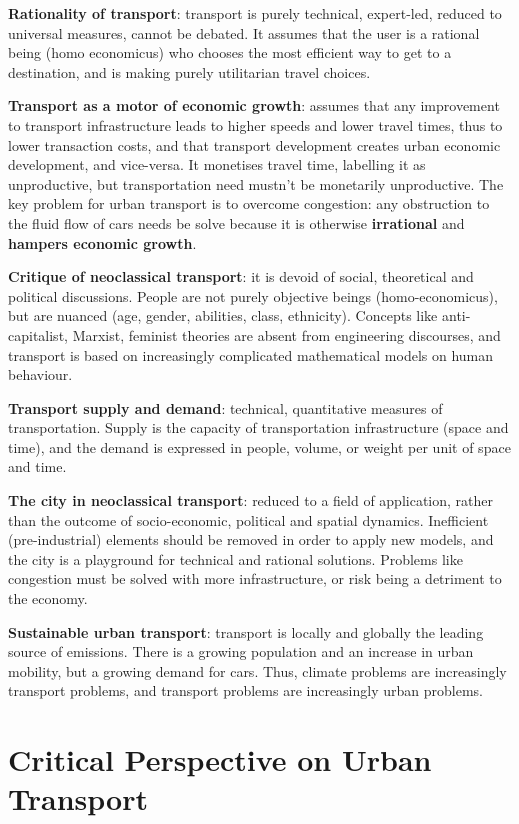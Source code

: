 \documentclass{article}
\newcommand{\alignedmarginpar}[1]{%
        \marginpar{\raggedright\small#1}}
\begin{document}
\textbf{Rationality of transport}: transport is purely technical, expert-led, reduced to universal measures, cannot be debated. It assumes that the user is a rational being (homo economicus) who chooses the most efficient way to get to a destination, and is making purely utilitarian travel choices.

\textbf{Transport as a motor of economic growth}: assumes that any improvement to transport infrastructure leads to higher speeds and lower travel times, thus to lower transaction costs, and that transport development creates urban economic development, and vice-versa. It monetises travel time, labelling it as unproductive, but transportation need mustn't be monetarily unproductive.\alignedmarginpar{Cycling for leisure}The key problem for urban transport is to overcome congestion: any obstruction to the fluid flow of cars needs be solve because it is otherwise \textbf{irrational} and \textbf{hampers economic growth}.

\textbf{Critique of neoclassical transport}: it is devoid of social, theoretical and political discussions. People are not purely objective beings (homo-economicus), but are nuanced (age, gender, abilities, class, ethnicity). Concepts like anti-capitalist, Marxist, feminist theories are absent from engineering discourses, and transport is based on increasingly complicated mathematical models on human behaviour.

\textbf{Transport supply and demand}: technical, quantitative measures of transportation. Supply is the capacity of transportation infrastructure (space and time), and the demand is expressed in people, volume, or weight per unit of space and time.

\textbf{The city in neoclassical transport}: reduced to a field of application, rather than the outcome of socio-economic, political and spatial dynamics. Inefficient (pre-industrial) elements should be removed in order to apply new models, and the city is a playground for technical and rational solutions. Problems like congestion must be solved with more infrastructure, or risk being a detriment to the economy.

\textbf{Sustainable urban transport}: transport is locally and globally the leading source of emissions. There is a growing population and an increase in urban mobility, but a growing demand for cars. Thus, climate problems are increasingly transport problems, and transport problems are increasingly urban problems.

\pagebreak\section{Critical Perspective on Urban Transport}
\end{document}
